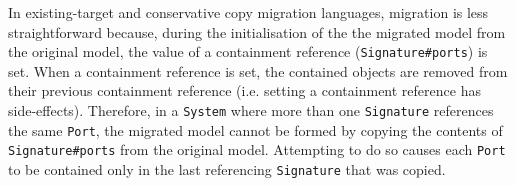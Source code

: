 In existing-target and conservative copy migration languages, migration is less straightforward because, during the initialisation of the the migrated model from the original model, the value of a containment reference (\texttt{Signature\#ports}) is set. When a containment reference is set, the contained objects are removed from their previous containment reference (i.e. setting a containment reference has side-effects). Therefore, in a \texttt{System} where more than one \texttt{Signature} references the same \texttt{Port}, the migrated model cannot be formed by copying the contents of \texttt{Signature\#ports} from the original model. Attempting to do so causes each \texttt{Port} to be contained only in the last referencing \texttt{Signature} that was copied.

% 
% 
% 
% 

